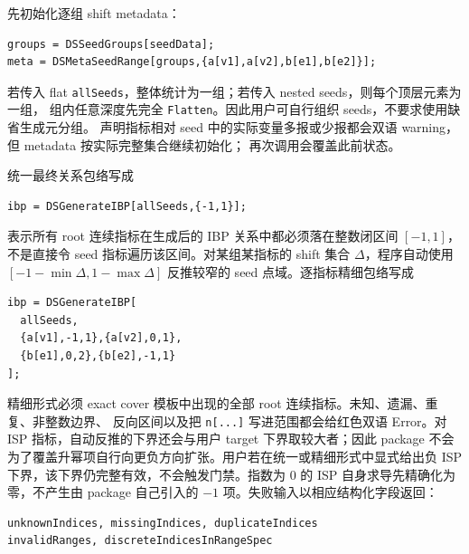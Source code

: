 ﻿\documentclass[a4paper,11pt]{article}
\begin{document}
先初始化逐组 shift metadata：
\begin{verbatim}
groups = DSSeedGroups[seedData];
meta = DSMetaSeedRange[groups,{a[v1],a[v2],b[e1],b[e2]}];
\end{verbatim}
若传入 flat \texttt{allSeeds}，整体统计为一组；若传入 nested seeds，则每个顶层元素为一组，
组内任意深度先完全 \texttt{Flatten}。因此用户可自行组织 seeds，不要求使用缺省生成元分组。
声明指标相对 seed 中的实际变量多报或少报都会双语 warning，但 metadata 按实际完整集合继续初始化；
再次调用会覆盖此前状态。

统一最终关系包络写成
\begin{verbatim}
ibp = DSGenerateIBP[allSeeds,{-1,1}];
\end{verbatim}
表示所有 root 连续指标在生成后的 IBP 关系中都必须落在整数闭区间 $[-1,1]$，不是直接令
seed 指标遍历该区间。对某组某指标的 shift 集合 $\Delta$，程序自动使用
$[-1-\min\Delta,1-\max\Delta]$ 反推较窄的 seed 点域。逐指标精细包络写成
\begin{verbatim}
ibp = DSGenerateIBP[
  allSeeds,
  {a[v1],-1,1},{a[v2],0,1},
  {b[e1],0,2},{b[e2],-1,1}
];
\end{verbatim}
精细形式必须 exact cover 模板中出现的全部 root 连续指标。未知、遗漏、重复、非整数边界、
反向区间以及把 \texttt{n[...]} 写进范围都会给红色双语 Error。对 ISP 指标，自动反推的下界还会与用户 target 下界取较大者；因此 package 不会为了覆盖升幂项自行向更负方向扩张。用户若在统一或精细形式中显式给出负 ISP 下界，该下界仍完整有效，不会触发门禁。指数为 $0$ 的 ISP 自身求导先精确化为零，不产生由 package 自己引入的 $-1$ 项。失败输入以相应结构化字段返回：
\begin{verbatim}
unknownIndices, missingIndices, duplicateIndices
invalidRanges, discreteIndicesInRangeSpec
\end{verbatim}
\end{document}
